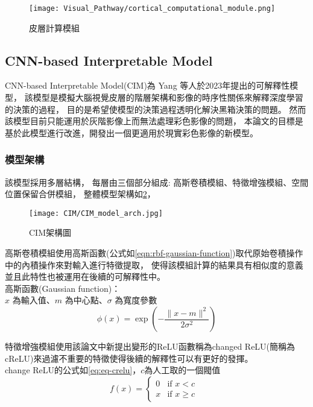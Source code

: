 \documentclass[class=NCU_thesis, crop=false]{standalone}
\begin{document}
\begin{figure}[H]
  \centering
  \texttt{[image: Visual\_Pathway/cortical\_computational\_module.png]}
  \caption{皮層計算模組~\cite{1180370208}}
  \label{fig:CorticalComputationalModule}
\end{figure}
\pagebreak


\subsection{CNN-based Interpretable Model}
CNN-based Interpretable Model(CIM)\cite{YangCNNInterpretable}為 Yang 等人於2023年提出的可解釋性模型，
該模型是模擬大腦視覺皮層的階層架構和影像的時序性關係來解釋深度學習的決策的過程，
目的是希望使模型的決策過程透明化解決黑箱決策的問題。
然而該模型目前只能運用於灰階影像上而無法處理彩色影像的問題，
本論文的目標是基於此模型進行改進，開發出一個更適用於現實彩色影像的新模型。

\subsubsection{模型架構}
該模型採用多層結構，
每層由三個部分組成: 高斯卷積模組、特徵增強模組、空間位置保留合併模組，
整體模型架構如\cref{fig:CIM_arch}，
\begin{figure}[H]
  \centering
  \texttt{[image: CIM/CIM\_model\_arch.jpg]}
  \caption{CIM架構圖~\cite{YangCNNInterpretable}}
  \label{fig:CIM_arch}
\end{figure}


高斯卷積模組使用高斯函數(公式如\cref{eqn:rbf-gaussian-function})取代原始卷積操作中的內積操作來對輸入進行特徵提取，
使得該模組計算的結果具有相似度的意義並且此特性也被運用在後續的可解釋性中。\\
  高斯函數(Gaussian function)：\\
  $x$ 為輸入值、$m$ 為中心點、$\sigma$ 為寬度參數
  \begin{equation}
      \label{eqn:rbf-gaussian-function}
      \phi (x) = \exp \left( -\frac{\| x-m \|^2}{2\sigma ^2} \right) 
  \end{equation}

特徵增強模組使用該論文中新提出變形的ReLU函數稱為changed ReLU(簡稱為cReLU)來過濾不重要的特徵使得後續的解釋性可以有更好的發揮。\\
change ReLU的公式如\cref{eq:eq-crelu}，$c$為人工取的一個閥值
\begin{equation}
    \label{eq:eq-crelu}
    f(x)= 
    \begin{cases}
        0 & \text{if  $x < c$ }\\
        x & \text{if  $x \geq c$}
    \end{cases}
\end{equation}
\end{document}
